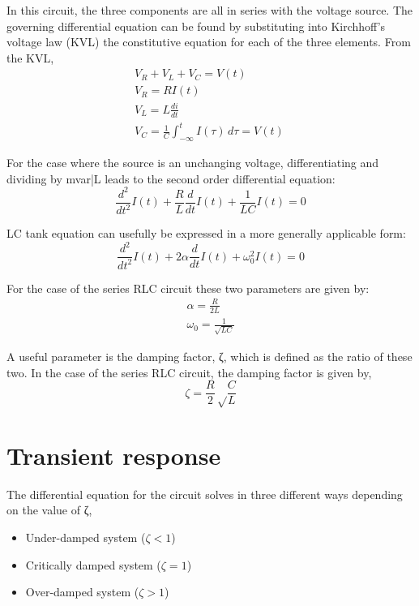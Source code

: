\documentclass[11pt]{article}
\begin{document}
In this circuit, the three components are all in series with the voltage source. The governing differential equation can be found by substituting into Kirchhoff's voltage law (KVL) the constitutive equation for each of the three elements. 
\hfil \break
From the KVL, 
\begin{eqnarray*}
V_R + V_L + V_C = V(t) \\
V_R = RI(t) \\
V_L = L\frac{di}{dt} \\
V_C = \frac{1}{C}\int_{-\infty}^t I(\tau)\, d\tau = V(t)\
\end{eqnarray*}

For the case where the source is an unchanging voltage, differentiating and dividing by {{mvar|L}} leads to the second order differential equation:
\begin{equation}
\frac{d^2}{dt^2}I(t) + \frac{R}{L} \frac{d}{dt}I(t) + \frac{1}{LC} I(t) = 0
\label{eom}
\end{equation}

LC tank equation can usefully be expressed in a more generally applicable form:
\begin{equation}
\frac{d^2}{dt^2}I(t) + 2 \alpha \frac{d}{dt}I(t) + \omega_0^2 I(t) = 0
\label{diff_eqn}
\end{equation}

For the case of the series RLC circuit these two parameters are given by:
\begin{eqnarray}
\alpha = \frac{R}{2L} \\
\label{def_zeta}
\omega_0 = \frac{1}{\sqrt{LC}}
\label{def_omega}
\end{eqnarray}

A useful parameter is the damping factor, ζ, which is defined as the ratio of these two. In the case of the series RLC circuit, the damping factor is given by,
\begin{equation}
\zeta = \frac{R}{2} \sqrt\frac{C}{L}
\label{damp_fac}
\end{equation}


\section{Transient response}

The differential equation for the circuit solves in three different ways depending on the value of ζ,

\begin{itemize}
	\item{Under-damped system ($\zeta < 1$)}
	\item{Critically damped system ($\zeta = 1$)}
	\item{Over-damped system ($\zeta > 1$)}
\end{itemize}
\end{document}
